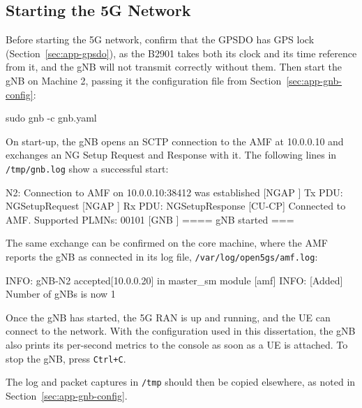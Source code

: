 \subsection{Starting the 5G Network}
\label{sec:app-start-5g}
Before starting the 5G network, confirm that the \gls{GPSDO} has GPS lock (Section~\ref{sec:app-gpsdo}), as the B2901 takes both its clock and its time reference from it, and the \gls{gNB} will not transmit correctly without them. Then start the \gls{gNB} on Machine 2, passing it the configuration file from Section~\ref{sec:app-gnb-config}:
\begin{code}
sudo gnb -c gnb.yaml
\end{code}
On start-up, the \gls{gNB} opens an \gls{SCTP} connection to the \gls{AMF} at 10.0.0.10 and exchanges an \gls{NG} Setup Request and Response with it. The following lines in \texttt{/tmp/gnb.log} show a successful start:
\begin{code}
[CU-CP] N2: Connection to AMF on 10.0.0.10:38412 was established
[NGAP ] Tx PDU: NGSetupRequest
[NGAP ] Rx PDU: NGSetupResponse
[CU-CP] Connected to AMF. Supported PLMNs: 00101
[GNB  ] ==== gNB started ===
\end{code}
The same exchange can be confirmed on the core machine, where the \gls{AMF} reports the \gls{gNB} as connected in its log file, \texttt{/var/log/open5gs/amf.log}:
\begin{code}
[amf] INFO: gNB-N2 accepted[10.0.0.20] in master_sm module
[amf] INFO: [Added] Number of gNBs is now 1
\end{code}
Once the \gls{gNB} has started, the 5G \gls{RAN} is up and running, and the \gls{UE} can connect to the network. With the configuration used in this dissertation, the \gls{gNB} also prints its per-second metrics to the console as soon as a \gls{UE} is attached. To stop the \gls{gNB}, press \texttt{Ctrl+C}.

The log and packet captures in \texttt{/tmp} should then be copied elsewhere, as noted in Section~\ref{sec:app-gnb-config}.

